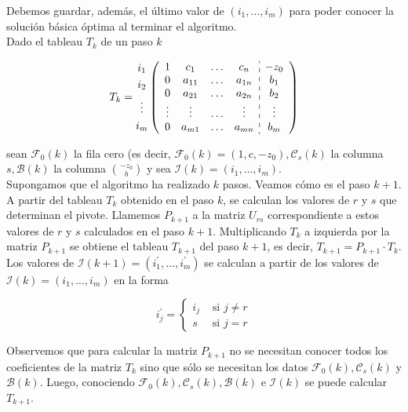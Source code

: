 \documentclass[10pt]{article}
\begin{document}
Debemos guardar, además, el último valor de $\left(i_{1}, \ldots, i_{m}\right)$ para poder conocer la solución básica óptima al terminar el algoritmo.\\
Dado el tableau $T_{k}$ de un paso $k$

$$
T_{k}=\begin{gathered}
i_{1} \\
i_{2} \\
\vdots \\
i_{m}
\end{gathered}\left(\begin{array}{cccc:c}
1 & c_{1} & \ldots & c_{n} & -z_{0} \\
0 & a_{11} & \ldots & a_{1 n} & b_{1} \\
0 & a_{21} & \ldots & a_{2 n} & b_{2} \\
\vdots & \vdots & \ldots & \vdots & \vdots \\
0 & a_{m 1} & \ldots & a_{m n} & b_{m}
\end{array}\right)
$$

sean $\mathcal{F}_{0}(k)$ la fila cero (es decir, $\mathcal{F}_{0}(k)=\left(1, c,-z_{0}\right), \mathcal{C}_{s}(k)$ la columna $s, \mathcal{B}(k)$ la columna $\binom{-z_{0}}{b}$ y sea $\mathcal{I}(k)=\left(i_{1}, \ldots, i_{m}\right)$.\\
Supongamos que el algoritmo ha realizado $k$ pasos. Veamos cómo es el paso $k+1$. A partir del tableau $T_{k}$ obtenido en el paso $k$, se calculan los valores de $r$ y $s$ que determinan el pivote. Llamemos $P_{k+1}$ a la matriz $U_{r s}$ correspondiente a estos valores de $r$ y $s$ calculados en el paso $k+1$. Multiplicando $T_{k}$ a izquierda por la matriz $P_{k+1}$ se obtiene el tableau $T_{k+1}$ del paso $k+1$, es decir, $T_{k+1}=P_{k+1} \cdot T_{k}$. Los valores de $\mathcal{I}(k+1)=\left(i_{1}^{\prime}, \ldots, i_{m}^{\prime}\right)$ se calculan a partir de los valores de $\mathcal{I}(k)=\left(i_{1}, \ldots, i_{m}\right)$ en la forma

$$
i_{j}^{\prime}= \begin{cases}i_{j} & \text { si } j \neq r \\ s & \text { si } j=r\end{cases}
$$

Observemos que para calcular la matriz $P_{k+1}$ no se necesitan conocer todos los coeficientes de la matriz $T_{k}$ sino que sólo se necesitan los datos $\mathcal{F}_{0}(k), \mathcal{C}_{s}(k)$ y $\mathcal{B}(k)$. Luego, conociendo $\mathcal{F}_{0}(k), \mathcal{C}_{s}(k), \mathcal{B}(k)$ e $\mathcal{I}(k)$ se puede calcular $T_{k+1}$.
\end{document}
